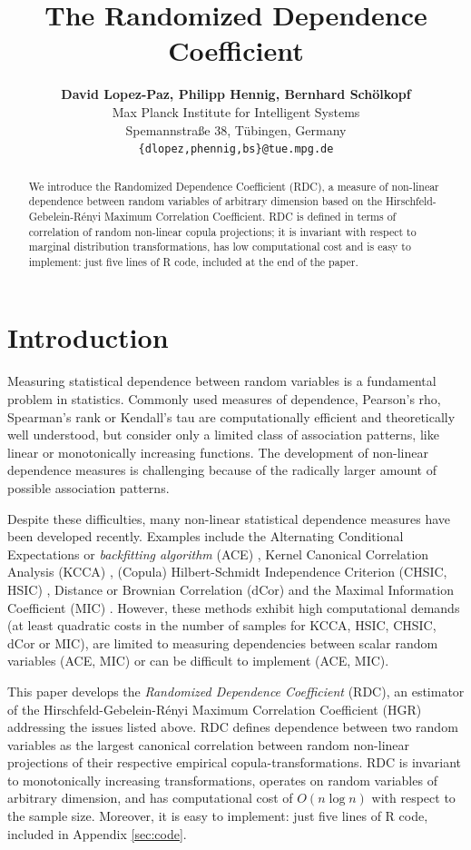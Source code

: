 \documentclass{article}
\title{The Randomized Dependence Coefficient}
\author{
  \textbf{David Lopez-Paz, Philipp Hennig, Bernhard Sch\"olkopf}\\
  Max Planck Institute for Intelligent Systems\\
  Spemannstra{\ss}e 38, T\"ubingen, Germany\\
  \texttt{\{dlopez,phennig,bs\}@tue.mpg.de}
}
\begin{document}
 
 
\maketitle 
 
\begin{abstract}
  We introduce the Randomized Dependence Coefficient (RDC), a measure of
  non-linear dependence between random variables of arbitrary dimension based
  on the Hirschfeld-Gebelein-R\'enyi Maximum Correlation Coefficient. RDC is
  defined in terms of correlation of random non-linear copula projections; it
  is invariant with respect to marginal distribution transformations, has low
  computational cost and is easy to implement: just five lines of R code,
  included at the end of the paper.
\end{abstract}

\section{Introduction}\label{sec:intro}
Measuring statistical dependence between random variables is a fundamental
problem in statistics. Commonly used measures of dependence, Pearson's rho,
Spearman's rank or Kendall's tau are computationally efficient and
theoretically well understood, but consider only a limited class of association
patterns, like linear or monotonically increasing functions. The development of
non-linear dependence measures is challenging because of the radically larger
amount of possible association patterns.

Despite these difficulties, many non-linear statistical dependence measures
have been developed recently. Examples include the Alternating Conditional
Expectations or \emph{backfitting algorithm} (ACE) \cite{Breiman85,Hastie86},
Kernel Canonical Correlation Analysis (KCCA) \cite{Bach02}, (Copula)
Hilbert-Schmidt Independence Criterion (CHSIC, HSIC)
\cite{Gretton05,Gretton12,Poczos12}, Distance or Brownian Correlation (dCor)
\cite{Szekely07,Szekely10} and the Maximal Information Coefficient (MIC)
\cite{Reshef11}. However, these methods exhibit high computational demands (at
least quadratic costs in the number of samples for KCCA, HSIC, CHSIC, dCor or
MIC), are limited to measuring dependencies between scalar random variables
(ACE, MIC) or can be difficult to implement (ACE, MIC).

This paper develops the \emph{Randomized Dependence Coefficient} (RDC), an
estimator of the Hirschfeld-Gebelein-R\'enyi Maximum Correlation Coefficient
(HGR) addressing the issues listed above. RDC defines dependence between two
random variables as the largest canonical correlation between random non-linear
projections of their respective empirical copula-transformations. RDC is
invariant to monotonically increasing transformations, operates on random
variables of arbitrary dimension, and has computational cost of $O(n\log n )$
with respect to the sample size.  Moreover, it is easy to implement: just five
lines of R code, included in Appendix \ref{sec:code}.
\end{document}
